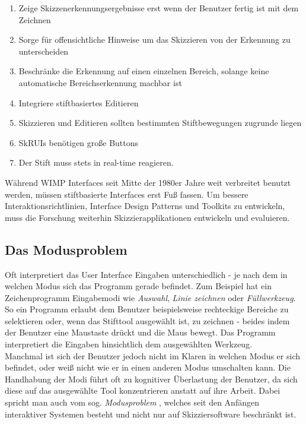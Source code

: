 \begin{enumerate}
	\item Zeige Skizzenerkennungsergebnisse erst wenn der Benutzer fertig ist mit dem Zeichnen
	\item Sorge für offensichtliche Hinweise um das Skizzieren von der Erkennung zu unterscheiden
	\item Beschränke die Erkennung auf einen einzelnen Bereich, solange keine automatische Bereichserkennung machbar ist
	\item Integriere stiftbasiertes Editieren
	\item Skizzieren und Editieren sollten bestimmten Stiftbewegungen zugrunde liegen
	\item SkRUIs benötigen große Buttons
	\item Der Stift muss stets in real-time reagieren.
\end{enumerate}

Während WIMP Interfaces seit Mitte der 1980er Jahre weit verbreitet benutzt werden, müssen stiftbasierte Interfaces erst Fuß fassen. Um bessere Interaktionsrichtlinien, Interface Design Patterns und Toolkits zu entwickeln, muss die Forschung weiterhin Skizzierapplikationen entwickeln und evaluieren.

\subsection{Das Modusproblem}\label{sec:ModusProblem}
Oft interpretiert das User Interface Eingaben unterschiedlich - je nach dem in welchen Modus sich das Programm gerade befindet. Zum Beispiel hat ein Zeichenprogramm Eingabemodi wie \emph{Auswahl}, \emph{Linie zeichnen} oder \emph{Füllwerkzeug}. So ein Programm erlaubt dem Benutzer beispielsweise rechteckige Bereiche zu selektieren oder, wenn das Stifttool ausgewählt ist, zu zeichnen - beides indem der Benutzer eine Maustaste drückt und die Maus bewegt. Das Programm interpretiert die Eingaben hinsichtlich dem ausgewählten Werkzeug. \\ Manchmal ist sich der Benutzer jedoch nicht im Klaren in welchen Modus er sich befindet, oder weiß nicht wie er in einen anderen Modus umschalten kann.  Die Handhabung der Modi führt oft zu kognitiver Überlastung der Benutzer, da sich diese auf das ausgewählte Tool konzentrieren anstatt auf ihre Arbeit. Dabei spricht man auch vom sog. \emph{Modusproblem} \citep{Tesler:1981}, welches seit den Anfängen interaktiver Systemen besteht und nicht nur auf Skizziersoftware beschränkt ist.

